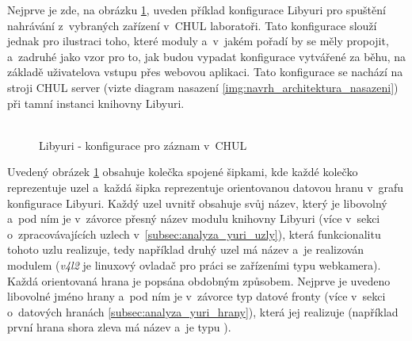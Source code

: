 \documentclass[thesis=M,czech]{FITthesis}[2012/06/26]
\begin{document}
Nejprve je zde, na obrázku \ref{img:navrh_backend_libyuri_sender}, uveden příklad konfigurace Libyuri pro spuštění nahrávání z~vybraných zařízení v~CHUL laboratoři. Tato konfigurace slouží jednak pro ilustraci toho, které moduly a~v~jakém pořadí by se měly propojit, a~zadruhé jako vzor pro to, jak budou vypadat konfigurace vytvářené za běhu, na základě uživatelova vstupu přes webovou aplikaci. Tato konfigurace se nachází na stroji CHUL server (vizte diagram nasazení \ref{img:navrh_architektura_nasazeni}) při tamní instanci knihovny Libyuri. 
\\\\
\begin{figure}[h]\centering
	\caption{Libyuri - konfigurace pro záznam v~CHUL}\label{img:navrh_backend_libyuri_sender}
\end{figure}

Uvedený obrázek \ref{img:navrh_backend_libyuri_sender} obsahuje kolečka spojené šipkami, kde každé kolečko reprezentuje uzel a~každá šipka reprezentuje orientovanou datovou hranu v~grafu konfigurace Libyuri. Každý uzel uvnitř obsahuje svůj název, který je libovolný a~pod ním je v~závorce přesný název modulu knihovny Libyuri (více v~sekci o~zpracovávajících uzlech v~\ref{subsec:analyza_yuri_uzly}), která funkcionalitu tohoto uzlu realizuje, tedy například druhý uzel má název  a~je realizován modulem  (\textit{v4l2} je linuxový ovladač pro práci se zařízeními typu webkamera). Každá orientovaná hrana je popsána obdobným způsobem. Nejprve je uvedeno libovolné jméno hrany a~pod ním je v~závorce typ datové fronty (více v~sekci o~datových hranách \ref{subsec:analyza_yuri_hrany}), která jej realizuje (například první hrana shora zleva má název  a~je typu ).
\end{document}
